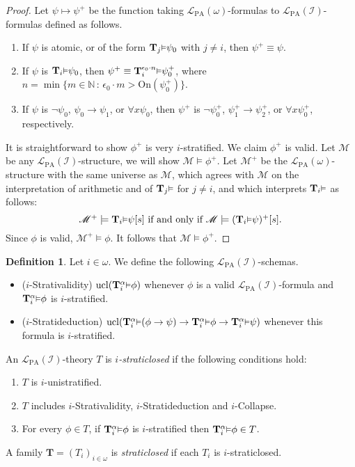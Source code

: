 \documentclass[reqno]{article}
\theoremstyle{definition}
\newtheorem{definition}[theorem]{Definition}
\def\N{\mathbb{N}}
\def\L{\mathscr{L}}
\def\T{\mathbf{T}}
\def\LPA{\L_{\mathrm{PA}}}
\def\indset{\mathcal I}
\def\onset{\mathrm{On}}
\renewcommand{\Pr}[1]{\T_{#1}\mbox{\small${\vDash}$}}
\newcommand{\Prr}[2]{\T^{#1}_{#2}\mbox{\small${\vDash}$}}
\newcommand{\ucl}[1]{\mathrm{ucl}(#1)}
\begin{document}
\begin{proof}
  Let $\psi\mapsto\psi^+$ be the function taking $\LPA(\omega)$-formulas to
  $\LPA(\indset)$-formulas defined as follows.
  \begin{enumerate}
    \item If $\psi$ is atomic, or of the form $\Pr j\psi_0$ with $j\neq i$,
    then $\psi^+\equiv\psi$.
    \item If $\psi$ is $\Pr i\psi_0$, then $\psi^+ \equiv \Prr {\epsilon_0\cdot n} i \psi_0^+$,
    where $n=\min\{m\in\N\,:\,\epsilon_0\cdot m > \onset(\psi_0^+)\}$.
    \item If $\psi$ is $\neg\psi_0$, $\psi_0\rightarrow\psi_1$, or $\forall x \psi_0$,
    then $\psi^+$ is $\neg\psi_0^+$, $\psi_1^+\rightarrow\psi_2^+$, or $\forall x \psi_0^+$,
    respectively.
  \end{enumerate}
  It is straightforward to show $\phi^+$ is very $i$-stratified.
  We claim $\phi^+$ is valid. Let $\mathscr M$ be any $\LPA(\indset)$-structure,
  we will show $\mathscr M\models\phi^+$.  Let $\mathscr M^+$ be the $\LPA(\omega)$-structure
  with the same universe as $\mathscr M$, which agrees with $\mathscr M$ on the interpretation
  of arithmetic and of $\Pr j$ for $j\not=i$, and which interprets $\Pr i$ as follows:
  \[
    \mbox{
      $\mathscr M^+\models \Pr i \psi[s]$ if and only if $\mathscr M\models (\Pr i\psi)^+[s]$.
    }
  \]
  Since $\phi$ is valid, $\mathscr M^+\models\phi$.
  It follows that $\mathscr M\models\phi^+$.
\end{proof}

\begin{definition}
\label{stratschemasdefn}
Let $i\in\omega$.
We define the following $\LPA(\indset)$-schemas.
\begin{itemize}
\item ($i$-Strativalidity) $\ucl{\Prr\alpha i\phi}$ whenever $\phi$ is a valid $\LPA(\indset)$-formula
and $\Prr\alpha i\phi$ is $i$-stratified.
\item ($i$-Stratideduction) $\ucl{\Prr\alpha i(\phi\rightarrow\psi)\rightarrow\Prr\alpha i\phi\rightarrow \Prr\alpha i\psi}$
whenever this formula is $i$-stratified.
\end{itemize}
An $\LPA(\indset)$-theory $T$ is \emph{$i$-straticlosed} if
the following conditions hold:
\begin{enumerate}
\item $T$ is $i$-unistratified.
\item $T$ includes $i$-Strativalidity, $i$-Stratideduction and $i$-Collapse.
\item For every $\phi\in T$, if $\Prr\alpha i\phi$ is $i$-stratified then
$\Prr\alpha i\phi\in T$.
\end{enumerate}
A family $\T=(T_i)_{i\in\omega}$ is \emph{straticlosed} if each $T_i$ is
$i$-straticlosed.
\end{definition}
\end{document}
